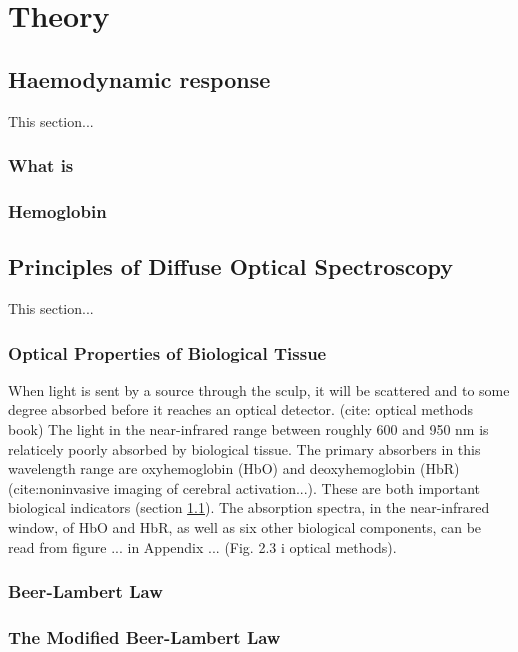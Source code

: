 \section{Theory}

\subsection{Haemodynamic response} \label{haemodynamic}
This section...
\subsubsection{What is}
\subsubsection{Hemoglobin}



\subsection{Principles of Diffuse Optical Spectroscopy}
This section...



\subsubsection{Optical Properties of Biological Tissue}
When light is sent by a source through the sculp, it will be scattered and to some degree absorbed before it reaches an optical detector. (cite: optical methods book) The light in the near-infrared range between roughly 600 and 950 nm is relaticely poorly absorbed by biological tissue. The primary absorbers in this wavelength range are oxyhemoglobin (HbO) and deoxyhemoglobin (HbR) (cite:noninvasive imaging of cerebral activation...). These are both important biological indicators (section \ref{haemodynamic}). The absorption spectra, in the near-infrared window, of HbO and HbR, as well as six other biological components, can be read from figure ... in Appendix ... (Fig. 2.3 i optical methods). 

\subsubsection{Beer-Lambert Law}

\subsubsection{The Modified Beer-Lambert Law}


